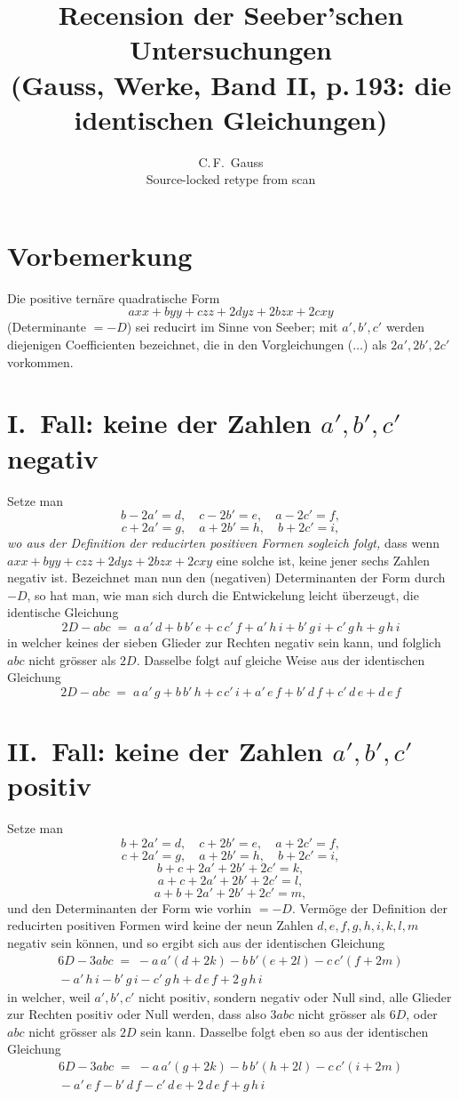 \documentclass[11pt]{article}
\title{Recension der Seeber'schen Untersuchungen\\[2pt]
\large (Gauss, Werke, Band II, p.\,193: die identischen Gleichungen)}
\author{C.\,F.\ Gauss\\[2pt]\normalsize Source-locked retype from scan}
\date{}
\begin{document}
\maketitle

\section*{Vorbemerkung}

Die positive ternäre quadratische Form
\[
  axx+byy+czz+2dyz+2bzx+2cxy
\]
(Determinante $=-D$) sei reducirt im Sinne von Seeber; mit $a',b',c'$ werden
diejenigen Coefficienten bezeichnet, die in den Vorgleichungen ($\dots$) als
$2a', 2b', 2c'$ vorkommen.

\section*{I.\ Fall: keine der Zahlen $a',b',c'$ negativ}

Setze man
\[
  b-2a'=d,\quad c-2b'=e,\quad a-2c'=f,
\]
\[
  c+2a'=g,\quad a+2b'=h,\quad b+2c'=i,
\]
\emph{wo aus der Definition der reducirten positiven Formen sogleich folgt,}
dass wenn $axx+byy+czz+2dyz+2bzx+2cxy$ eine solche ist, keine jener sechs
Zahlen negativ ist. Bezeichnet man nun den (negativen) Determinanten der Form
durch $-D$, so hat man, wie man sich durch die Entwickelung leicht überzeugt,
die identische Gleichung
\[
\boxed{\;2D-abc \;=\; a\,a'\,d+b\,b'\,e+c\,c'\,f+a'\,h\,i+b'\,g\,i+c'\,g\,h+g\,h\,i\;}
\]
in welcher keines der sieben Glieder zur Rechten negativ sein kann, und folglich
$abc$ nicht grösser als $2D$. Dasselbe folgt auf gleiche Weise aus der
identischen Gleichung
\[
\boxed{\;2D-abc \;=\; a\,a'\,g+b\,b'\,h+c\,c'\,i+a'\,e\,f+b'\,d\,f+c'\,d\,e+d\,e\,f\;}
\]

\section*{II.\ Fall: keine der Zahlen $a',b',c'$ positiv}

Setze man
\[
  b+2a'=d,\quad c+2b'=e,\quad a+2c'=f,
\]
\[
  c+2a'=g,\quad a+2b'=h,\quad b+2c'=i,
\]
\[
  b+c+2a'+2b'+2c'=k,
\]
\[
  a+c+2a'+2b'+2c'=l,
\]
\[
  a+b+2a'+2b'+2c'=m,
\]
und den Determinanten der Form wie vorhin $=-D$. Vermöge der Definition der
reducirten positiven Formen wird keine der neun Zahlen $d,e,f,g,h,i,k,l,m$
negativ sein können, und so ergibt sich aus der identischen Gleichung
\begin{multline*}
6D-3abc \;=\; -a\,a'(d+2k)-b\,b'(e+2l)-c\,c'(f+2m)\\
{}-a'\,h\,i-b'\,g\,i-c'\,g\,h+d\,e\,f+2\,g\,h\,i
\end{multline*}
in welcher, weil $a',b',c'$ nicht positiv, sondern negativ oder Null sind, alle
Glieder zur Rechten positiv oder Null werden, dass also $3abc$ nicht grösser als
$6D$, oder $abc$ nicht grösser als $2D$ sein kann. Dasselbe folgt eben so aus
der identischen Gleichung
\begin{multline*}
6D-3abc \;=\; -a\,a'(g+2k)-b\,b'(h+2l)-c\,c'(i+2m)\\
{}-a'\,e\,f-b'\,d\,f-c'\,d\,e+2\,d\,e\,f+g\,h\,i
\end{multline*}
\end{document}
